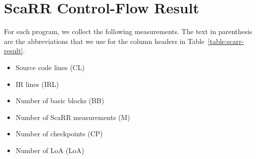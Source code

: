 \section{ScaRR Control-Flow Result}

For each program, we collect the following measurements. The text in parenthesis
are the abbreviations that we use for the column headers in
Table~\ref{table:scarr-result}.

\begin{itemize}
    \item Source code lines (CL)
    \item IR lines (IRL)
    \item Number of basic blocks (BB)
    \item Number of ScaRR measurements (M)
    \item Number of checkpoints (CP)
    \item Number of LoA (LoA)
\end{itemize}



